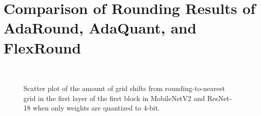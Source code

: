 \documentclass{article}
\theoremstyle{plain}
\theoremstyle{definition}
\theoremstyle{remark}
\begin{document}
\nocite{langley00}

\newpage





\newpage
\appendix
\onecolumn
\section{Comparison of Rounding Results of AdaRound, AdaQuant, and FlexRound}\label{appendix:comparison}

\begin{figure}[h]
    \centering
    \\
    \caption{Scatter plot of the amount of grid shifts from rounding-to-nearest grid in the first layer of the first block in MobileNetV2 and ResNet-18 when only weights are quantized to $4$-bit.} %
    \label{fig:scatter_comparison}
\end{figure}
\end{document}
